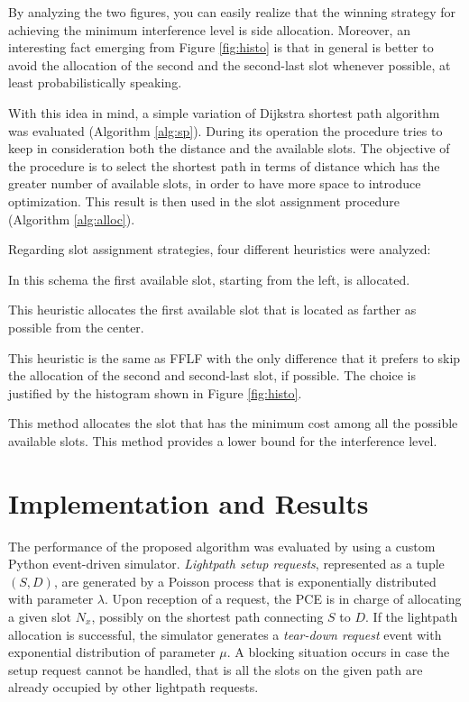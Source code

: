 \documentclass[9pt,twocolumn]{article}
\begin{document}
By analyzing the two figures, you can easily realize that the winning strategy for achieving the minimum interference level is side allocation. Moreover, an interesting fact emerging from Figure \ref{fig:histo} is that in general is better to avoid the allocation of the second and the second-last slot whenever possible, at least probabilistically speaking.

With this idea in mind, a simple variation of Dijkstra shortest path algorithm was evaluated (Algorithm \ref{alg:sp}). During its operation the procedure tries to keep in consideration both the distance and the available slots. The objective of the procedure is to select the shortest path in terms of distance which has the greater number of available slots, in order to have more space to introduce optimization. This result is then used in the slot assignment procedure (Algorithm \ref{alg:alloc}).

Regarding slot assignment strategies, four different heuristics were analyzed:

\begin{description}
	\setlength{\itemsep}{1.5pt}
	\setlength{\parskip}{0pt}
	\setlength{\parsep}{0pt}

	\item[First Fit] In this schema the first available slot, starting from the left, is allocated.

	\item[First Fit / Last Fit] This heuristic allocates the first available slot that is located as farther as possible from the center.

	\item[First Fit / Last Fit 2] This heuristic is the same as FFLF with the only difference that it prefers to skip the allocation of the second and second-last slot, if possible. The choice is justified by the histogram shown in Figure \ref{fig:histo}.

	\item[MinCost] This method allocates the slot that has the minimum cost among all the possible available slots. This method provides a lower bound for the interference level.
\end{description}

\section{Implementation and Results}

The performance of the proposed algorithm was evaluated by using a custom Python event-driven simulator. \emph{Lightpath setup requests}, represented as a tuple $(S, D)$, are generated by a Poisson process that is exponentially distributed with parameter $\lambda$. Upon reception of a request, the PCE is in charge of allocating a given slot $N_x$, possibly on the shortest path connecting $S$ to $D$. If the lightpath allocation is successful, the simulator generates a \emph{tear-down request} event with exponential distribution of parameter $\mu$. A blocking situation occurs in case the setup request cannot be handled, that is all the slots on the given path are already occupied by other lightpath requests.
\end{document}
